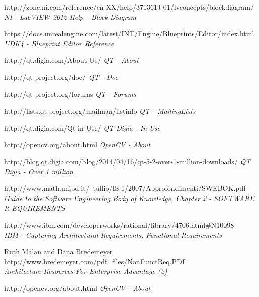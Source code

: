 \documentclass[a4paper,12pt,oneside]{report}
\begin{document}
\begin{thebibliography}{99}
		http://zone.ni.com/reference/en-XX/help/371361J-01/lvconcepts/blockdiagram/\\
        {\em NI - LabVIEW 2012 Help - Block Diagram}  

		https://docs.unrealengine.com/latest/INT/Engine/Blueprints/Editor/index.html\\
        {\em UDK4 - Blueprint Editor Reference}  


		http://qt.digia.com/About-Us/
        {\em QT - About } 
 
        http://qt-project.org/doc/
        {\em QT - Doc} 
         
        http://qt-project.org/forums
        {\em QT - Forums}        

          http://lists.qt-project.org/mailman/listinfo 
        {\em QT - MailingLists}        


        http://qt.digia.com/Qt-in-Use/
        {\em QT Digia - In Use}  
        
        
        http://opencv.org/about.html
        {\em OpenCV - About}  
        
        
		http://blog.qt.digia.com/blog/2014/04/16/qt-5-2-over-1-million-downloads/
        {\em QT Digia - Over 1 million}  
        
        http://www.math.unipd.it/~tullio/IS-1/2007/Approfondimenti/SWEBOK.pdf\\
        {\em Guide to the Software Engineering Body of Knowledge, Chapter 2 - SOFTWARE R EQUIREMENTS}
        
        
		http://www.ibm.com/developerworks/rational/library/4706.html\#N10098 \\
        {\em IBM - Capturing Architectural Requirements, Functional Requirements }
        
		Ruth Malan and Dana Bredemeyer
		http://www.bredemeyer.com/pdf\_files/NonFunctReq.PDF \\
        {\em Architecture Resources For Enterprise Advantage (2)\\}
        

        http://opencv.org/about.html
        {\em OpenCV - About}  


\end{thebibliography}
\end{document}

